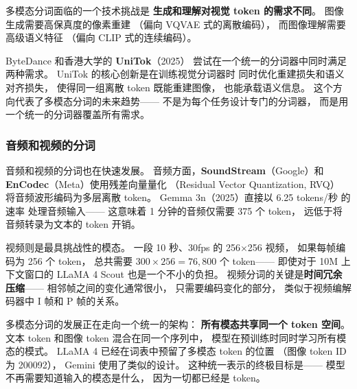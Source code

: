 多模态分词面临的一个技术挑战是
\textbf{生成和理解对视觉 token 的需求不同}。
图像生成需要高保真度的像素重建
（偏向 VQVAE 式的离散编码），
而图像理解需要高级语义特征
（偏向 CLIP 式的连续编码）。

ByteDance 和香港大学的 \textbf{UniTok}（2025）
尝试在一个统一的分词器中同时满足两种需求。
UniTok 的核心创新是在训练视觉分词器时
同时优化重建损失和语义对齐损失，
使得同一组离散 token 既能重建图像，
也能承载语义信息。
这个方向代表了多模态分词的未来趋势——
不是为每个任务设计专门的分词器，
而是用一个统一的分词器覆盖所有需求。

\subsubsection{音频和视频的分词}

音频和视频的分词也在快速发展。
音频方面，\textbf{SoundStream}（Google）和
\textbf{EnCodec}（Meta）使用残差向量量化
（Residual Vector Quantization, RVQ）
将音频波形编码为多层离散 token。
Gemma 3n（2025）直接以 6.25 tokens/秒 的速率
处理音频输入——
这意味着 1 分钟的音频仅需要 375 个 token，
远低于将音频转录为文本的 token 开销。

视频则是最具挑战性的模态。
一段 10 秒、30fps 的 256$\times$256 视频，
如果每帧编码为 256 个 token，
总共需要 $300 \times 256 = 76{,}800$ 个 token——
即使对于 10M 上下文窗口的 LLaMA 4 Scout
也是一个不小的负担。
视频分词的关键是\textbf{时间冗余压缩}——
相邻帧之间的变化通常很小，
只需要编码变化的部分，
类似于视频编解码器中 I 帧和 P 帧的关系。

\begin{corebox}[多模态分词的统一愿景]
多模态分词的发展正在走向一个统一的架构：
\textbf{所有模态共享同一个 token 空间}。
文本 token 和图像 token 混合在同一个序列中，
模型在预训练时同时学习所有模态的模式。
LLaMA 4 已经在词表中预留了多模态 token 的位置
（图像 token ID 为 200092），
Gemini 使用了类似的设计。
这种统一表示的终极目标是——
模型不再需要知道输入的模态是什么，
因为一切都已经是 token。
\end{corebox}


